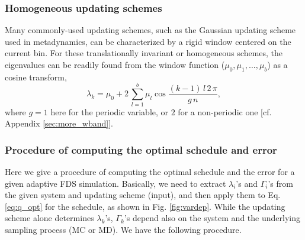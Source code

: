 \documentclass[reprint, superscriptaddress, floatfix]{revtex4-1}
\begin{document}
\subsubsection{\label{sec:band-matrix}
Homogeneous updating schemes}



Many commonly-used updating schemes,
such as the Gaussian updating scheme
used in metadynamics,
can be characterized by a rigid window
centered on the current bin.
%
For these translationally invariant or homogeneous
schemes, the eigenvalues can be readily found
from the window function ($\mu_0, \mu_1, \dots, \mu_b$)
as a cosine transform,
%
\begin{equation}
  \lambda_k
  =
  \mu_0
  +
  2 \,
  \sum_{ l = 1 }^b
  \mu_l
  \cos
  \frac{ (k - 1) \, l \, 2 \, \pi }
       {            g \, n        }
  ,
  \label{eq:wband_eigenvalue}
\end{equation}
%
where $g = 1$ here for the periodic variable,
or $2$ for a non-periodic one
[cf. Appendix \ref{sec:more_wband}].



\subsubsection{\label{sec:procedure}
Procedure of computing the optimal schedule and error
}


Here we give a procedure of computing
the optimal schedule and the error
for a given adaptive FDS simulation.
%
Basically, we need to extract
$\lambda_i$'s and $\Gamma_i$'s
from the given system and updating scheme (input),
and then apply them to Eq. \eqref{eq:q_opt}
for the schedule,
as shown in Fig. \ref{fig:vardep}.
%
%
While the updating scheme alone
determines $\lambda_k$'s,
$\Gamma_k$'s depend also on the system
and the underlying sampling process (MC or MD).
%
We have the following procedure.
\end{document}
